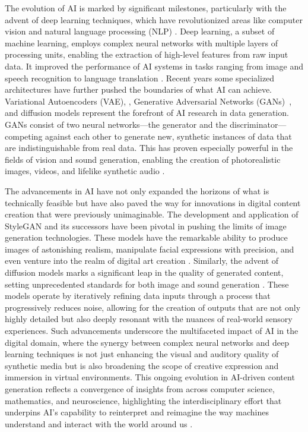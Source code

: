 \documentclass[11pt,a4paper,oneside]{report}
\begin{document}
The evolution of AI is marked by significant milestones, particularly with the advent of deep learning \cite{lecun2015deep} techniques, which have revolutionized areas like computer vision \cite{voulodimos2018deep} and natural language processing (NLP) \cite{chowdhary2020natural}. 
Deep learning, a subset of machine learning, employs complex neural networks with multiple layers of processing units, enabling the extraction of high-level features from raw input data. 
It improved the performance of AI systems in tasks ranging from image and speech recognition to language translation \cite{goodfellow2016deep}.
Recent years some specialized architectures have further pushed the boundaries of what AI can achieve. 
Variational Autoencoders (VAE), \cite{rezende2014stochastic, kingma2013auto}, Generative Adversarial Networks (GANs)~\cite{goodfellow2014generative, vondrick2016generating, tulyakov2018mocogan, clark2019adversarial, brooks2022generating}, and diffusion models \cite{rombach2022high, ho2022imagen, blattmann2023align, gupta2023photorealistic} represent the forefront of AI research in data generation. 
GANs consist of two neural networks—the generator and the discriminator—competing against each other to generate new, synthetic instances of data that are indistinguishable from real data. 
This has proven especially powerful in the fields of vision and sound generation, enabling the creation of photorealistic images, videos, and lifelike synthetic audio \cite{granot2022drop}.

The advancements in AI have not only expanded the horizons of what is technically feasible but have also paved the way for innovations in digital content creation that were previously unimaginable. 
The development and application of StyleGAN \cite{karras2019style} and its successors have been pivotal in pushing the limits of image generation technologies. 
These models have the remarkable ability to produce images of astonishing realism, manipulate facial expressions with precision, and even venture into the realm of digital art creation \cite{patashnik2021styleclip}. 
Similarly, the advent of diffusion models marks a significant leap in the quality of generated content, setting unprecedented standards for both image and sound generation \cite{rombach2022high}. 
These models operate by iteratively refining data inputs through a process that progressively reduces noise, allowing for the creation of outputs that are not only highly detailed but also deeply resonant with the nuances of real-world sensory experiences. 
Such advancements underscore the multifaceted impact of AI in the digital domain, where the synergy between complex neural networks and deep learning techniques is not just enhancing the visual and auditory quality of synthetic media but is also broadening the scope of creative expression and immersion in virtual environments. 
This ongoing evolution in AI-driven content generation reflects a convergence of insights from across computer science, mathematics, and neuroscience, highlighting the interdisciplinary effort that underpins AI's capability to reinterpret and reimagine the way machines understand and interact with the world around us \cite{silver2016mastering}.
\end{document}
